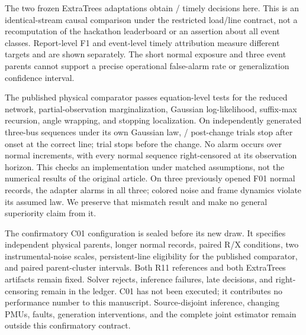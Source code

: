 The two frozen ExtraTrees adaptations obtain \ContETTimely{}/\ContMixTotal{} timely decisions here. This is an identical-stream causal comparison under the restricted load/line contract, not a recomputation of the hackathon leaderboard or an assertion about all event classes. Report-level F1 and event-level timely attribution measure different targets and are shown separately. The short normal exposure and three event parents cannot support a precise operational false-alarm rate or generalization confidence interval.

The published physical comparator passes equation-level tests for the reduced network, partial-observation marginalization, Gaussian log-likelihood, suffix-max recursion, angle wrapping, and stopping localization. On independently generated three-bus sequences under its own Gaussian law, \ChenMatchedCorrect{}/\ChenMatchedTotal{} post-change trials stop after onset at the correct line; \ChenMatchedEarly{} trial stops before the change. No alarm occurs over \ChenNormalExposure{} normal increments, with every normal sequence right-censored at its observation horizon. This checks an implementation under matched assumptions, not the numerical results of the original article. On three previously opened F01 normal records, the adapter alarms in all three; colored noise and frame dynamics violate its assumed law. We preserve that mismatch result and make no general superiority claim from it.

The confirmatory C01 configuration is sealed before its new draw. It specifies independent physical parents, longer normal records, paired R/X conditions, two instrumental-noise scales, persistent-line eligibility for the published comparator, and paired parent-cluster intervals. Both R11 references and both ExtraTrees artifacts remain fixed. Solver rejects, inference failures, late decisions, and right-censoring remain in the ledger. C01 has not been executed; it contributes no performance number to this manuscript. Source-disjoint inference, changing PMUs, faults, generation interventions, and the complete joint estimator remain outside this confirmatory contract.
